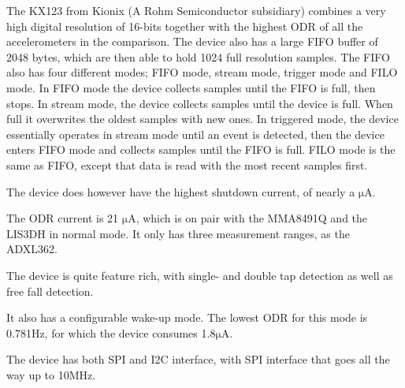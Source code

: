 The KX123 from Kionix (A Rohm Semiconductor subsidiary) combines a very high digital resolution of 16-bits together with the highest ODR of all the accelerometers in the comparison. The device also has a large FIFO buffer of 2048 bytes, which are then able to hold 1024 full resolution samples. The FIFO also has four different modes; FIFO mode, stream mode, trigger mode and FILO mode. In FIFO mode the device collects samples until the FIFO is full, then stops. In stream mode, the device collects samples until the device is full. When full it overwrites the oldest samples with new ones. In triggered mode, the device essentially operates in stream mode until an event is detected, then the device enters FIFO mode and collects samples until the FIFO is full. FILO mode is the same as FIFO, except that data is read with the most recent samples first.

The device does however have the highest shutdown current, of nearly a $\si{\micro\ampere}$. 

The ODR current is 21 $\si{\micro\ampere}$, which is on pair with the MMA8491Q and the LIS3DH in normal mode. It only has three measurement ranges, as the ADXL362.

The device is quite feature rich, with single- and double tap detection as well as free fall detection.

It also has a configurable wake-up mode. The lowest ODR for this mode is 0.781Hz, for which the device consumes 1.8$\si{\micro\ampere}$. 

The device has both SPI and I2C interface, with SPI interface that goes all the way up to 10MHz.